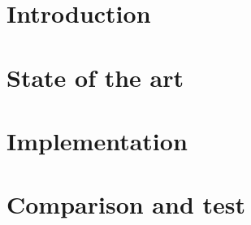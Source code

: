 \documentclass[a4paper,12pt,openright,twoside]{report}
\theoremstyle{plain}
\theoremstyle{definition}
\begin{document}





\tableofcontents{}

\clearpage{\pagestyle{empty}\cleardoublepage}
\chapter{Introduction}
         

\clearpage{\pagestyle{empty}\cleardoublepage}
\chapter{State of the art}


\clearpage{\pagestyle{empty}\cleardoublepage}
\chapter{Implementation}


\clearpage{\pagestyle{empty}\cleardoublepage}
\chapter{Comparison and test}



\end{document}
